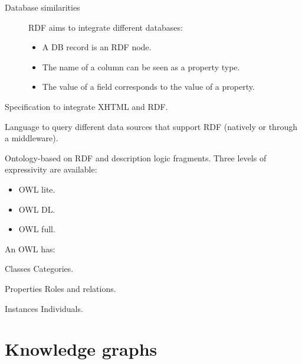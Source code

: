 \begin{description}
\begin{description}
            \item[Database similarities]
                RDF aims to integrate different databases:
                \begin{itemize}
                    \item A DB record is an RDF node.
                    \item The name of a column can be seen as a property type.
                    \item The value of a field corresponds to the value of a property.
                \end{itemize}
        \end{description}

    \item[RDFa] 
        Specification to integrate XHTML and RDF.

    \item[SPARQL] 
        Language to query different data sources that support RDF (natively or through a middleware).

    \item[Ontology web language (OWL)] 
        Ontology-based on RDF and description logic fragments.
        Three levels of expressivity are available:
        \begin{itemize}
            \item OWL lite.
            \item OWL DL.
            \item OWL full.
        \end{itemize}

        An OWL has:
        \begin{descriptionlist}
            \item[Classes] Categories.
            \item[Properties] Roles and relations.
            \item[Instances] Individuals.
        \end{descriptionlist}
\end{description}



\section{Knowledge graphs}

